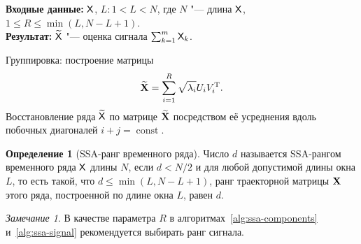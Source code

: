 \documentclass[specialist,
    substylefile = spbu.rtx,
    subf,href,colorlinks=true, 12pt]{disser}
\theoremstyle{plain}
\theoremstyle{definition}
\newtheorem{definition}{Определение}[section]
\theoremstyle{remark}
\newtheorem*{remark}{Замечание}
\newcommand{\Input}{\textbf{Входные данные: }}
\newcommand{\Output}{\textbf{Результат: }}
\begin{document}
    \begin{algorithm}[!h]
        \caption{SSA для выделения сигнала.}
        \label{alg:ssa-signal}
        \Input $\mathsf{X}$, $L: 1 < L < N$, где $N$ "--- длина $\mathsf{X}$, $1 \leqslant R\leqslant \min(L, N-L+1)$.\\
        \Output $\widetilde{\mathsf{X}}$ "--- оценка сигнала $\sum_{k=1}^{m} \mathsf{X}_k$.
        \begin{algorithmic}[1]
            \setcounter{ALG@line}{2}
            \State Группировка: построение матрицы
            \begin{equation*}
                \widetilde{\mathbf{X}} = \sum_{i = 1}^{R} \sqrt{\lambda_i} U_i V_i^{\mathrm{T}}.
            \end{equation*}
            \State Восстановление ряда $\widetilde{\mathsf{X}}$ по матрице $\widetilde{\mathbf{X}}$ посредством её усреднения 
            вдоль побочных диагоналей $i + j =\operatorname{const}$.
        \end{algorithmic}
    \end{algorithm}
    
    \begin{definition}[SSA-ранг временного ряда]
        \label{def:ssa-rank}
        Число $d$ называется SSA-рангом временного ряда $\mathsf{X}$ длины $N$, если $d < N / 2$ и для любой допустимой 
        длины окна $L$,
        то есть такой, что $d \leqslant \min(L, N- L + 1)$, ранг траекторной матрицы $\mathbf{X}$ этого ряда, построенной по
        длине окна $L$, равен $d$.
    \end{definition}
    \begin{remark}
        В качестве параметра $R$ в алгоритмах~\ref{alg:ssa-components} и~\ref{alg:ssa-signal} рекомендуется выбирать
        ранг сигнала.
    \end{remark}
    
\end{document}
